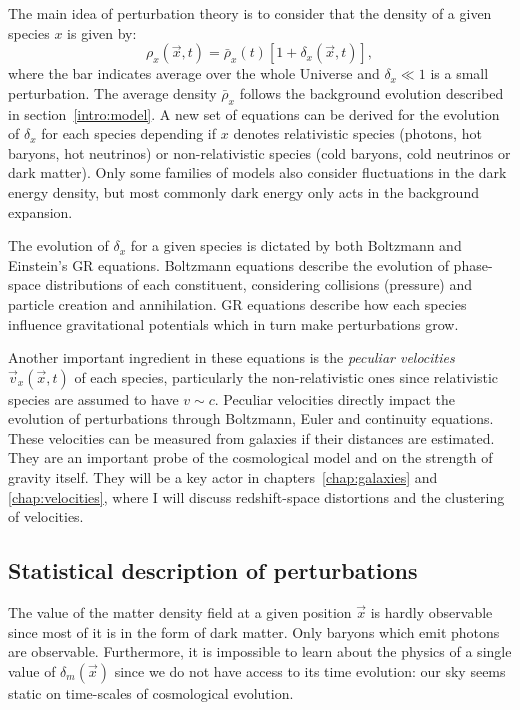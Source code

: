     The main idea of perturbation theory is to consider that
    the density of a given species $x$ is given by:
    \begin{equation}
        \rho_x(\vec{x}, t) = \bar{\rho}_x(t)\left[1 + \delta_x(\vec{x}, t)\right],
    \end{equation}
    where the bar indicates average over the whole Universe and 
    $\delta_x \ll 1$ is a small perturbation. The average density 
    $\bar{\rho}_x$ follows the background evolution described in 
    section~\ref{intro:model}. 
    A new set of equations can be derived for the evolution of $\delta_x$ for each species 
    depending if $x$ denotes relativistic species (photons, hot baryons, hot neutrinos) 
    or non-relativistic species (cold baryons, cold neutrinos or dark matter). 
    Only some families of models also consider fluctuations in the dark energy density,
    but most commonly dark energy only acts in the background expansion. 

    The evolution of $\delta_x$ for a given species is dictated by both 
    Boltzmann and Einstein's GR equations. Boltzmann equations describe 
    the evolution of phase-space distributions of each constituent, considering
    collisions (pressure) and particle creation and annihilation. GR equations
    describe how each species influence gravitational potentials which in turn 
    make perturbations grow.

    Another important ingredient in these equations is the 
    \emph{peculiar velocities} $\vec{v}_x(\vec{x}, t)$ of 
    each species, particularly the non-relativistic ones since 
    relativistic species are assumed to have $v \sim c$. 
    Peculiar velocities directly impact the evolution of perturbations through 
    Boltzmann, Euler and continuity equations. 
    These velocities can be measured from galaxies if their distances are estimated.
    They are an important probe of the cosmological model and on the strength of 
    gravity itself. 
    They will be a key actor in chapters~\ref{chap:galaxies} and \ref{chap:velocities},
    where I will discuss redshift-space distortions and the clustering of velocities.  
    
    \subsection{Statistical description of perturbations}
    \label{intro:lss:statistics}

    The value of the matter density field at a given position $\vec{x}$ is 
    hardly observable since most of it is in the form of dark matter. 
    Only baryons which emit photons are observable. 
    Furthermore, it is impossible to learn about the physics of a single value of $\delta_m(\vec{x})$
    since we do not have access to its time evolution: our sky seems static on time-scales 
    of cosmological evolution. 
    
